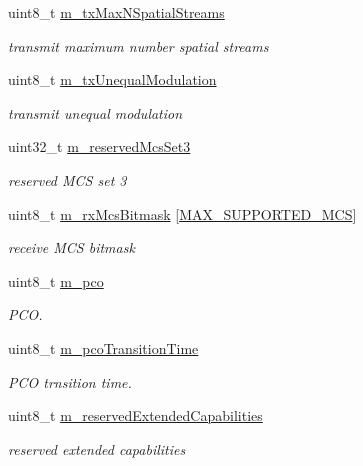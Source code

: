 \begin{DoxyCompactItemize}
uint8\+\_\+t \hyperlink{classns3_1_1HtCapabilities_a936670bd18443100ffc6a83443101566}{m\+\_\+tx\+Max\+N\+Spatial\+Streams}
\begin{DoxyCompactList}\small\item\em transmit maximum number spatial streams \end{DoxyCompactList}\item 
uint8\+\_\+t \hyperlink{classns3_1_1HtCapabilities_a867b8deccdd5103df2f88fd019ea1876}{m\+\_\+tx\+Unequal\+Modulation}
\begin{DoxyCompactList}\small\item\em transmit unequal modulation \end{DoxyCompactList}\item 
uint32\+\_\+t \hyperlink{classns3_1_1HtCapabilities_ad8417be9a6de31fa230aeb7eb909e09d}{m\+\_\+reserved\+Mcs\+Set3}
\begin{DoxyCompactList}\small\item\em reserved M\+CS set 3 \end{DoxyCompactList}\item 
uint8\+\_\+t \hyperlink{classns3_1_1HtCapabilities_a737a933aa05ba9007781fa6b612782ab}{m\+\_\+rx\+Mcs\+Bitmask} \mbox{[}\hyperlink{ht-operation_8h_a309e0519adb78c8fe6aed48ca762e21e}{M\+A\+X\+\_\+\+S\+U\+P\+P\+O\+R\+T\+E\+D\+\_\+\+M\+CS}\mbox{]}
\begin{DoxyCompactList}\small\item\em receive M\+CS bitmask \end{DoxyCompactList}\item 
uint8\+\_\+t \hyperlink{classns3_1_1HtCapabilities_a64f014b091b83a3c29ba54109299a12d}{m\+\_\+pco}
\begin{DoxyCompactList}\small\item\em P\+CO. \end{DoxyCompactList}\item 
uint8\+\_\+t \hyperlink{classns3_1_1HtCapabilities_a9736ce9e122507b9bc3c733047192dda}{m\+\_\+pco\+Transition\+Time}
\begin{DoxyCompactList}\small\item\em P\+CO trnsition time. \end{DoxyCompactList}\item 
uint8\+\_\+t \hyperlink{classns3_1_1HtCapabilities_a87d11401a6a2835f2ddf0e586ed77544}{m\+\_\+reserved\+Extended\+Capabilities}
\begin{DoxyCompactList}\small\item\em reserved extended capabilities \end{DoxyCompactList}\item 

\end{DoxyCompactItemize}

